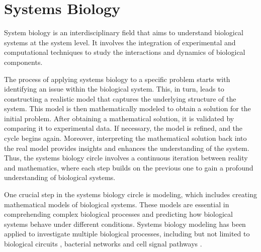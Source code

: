 \section{Systems Biology}

System biology \cite{kitano2002systems,alon2019introduction} is an interdisciplinary field that aims to understand biological systems at the system level. It involves the integration of experimental and computational techniques to study the interactions and dynamics of biological components.



The process of applying systems biology to a specific problem starts with identifying an issue within the biological system. This, in turn, leads to constructing a realistic model that captures the underlying structure of the system. This model is then mathematically modeled to obtain a solution for the initial problem. After obtaining a mathematical solution, it is validated by comparing it to experimental data. If necessary, the model is refined, and the cycle begins again. Moreover, interpreting the mathematical solution back into the real model provides insights and enhances the understanding of the system. Thus, the systems biology circle involves a continuous iteration between reality and mathematics, where each step builds on the previous one to gain a profound understanding of biological systems.


One crucial step in the systems biology circle is modeling, which includes creating mathematical models of biological systems. These models are essential in comprehending complex biological processes and predicting how biological systems behave under different conditions. Systems biology modeling has been applied to investigate multiple biological processes, including but not limited to biological circuits \cite{alon2019introduction}, bacterial networks \cite{covert2004integrating} and cell signal pathways \cite{kholodenko2006cell}.

